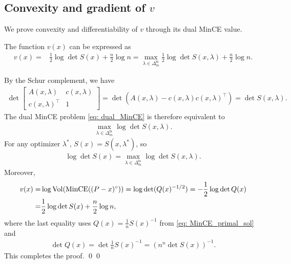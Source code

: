 \documentclass[smallextended]{svjour3}
\let\springerproof\proof
\let\endspringerproof\endproof
\renewenvironment{proof}{\springerproof}{%
  \ifhmode\qed\else\leavevmode\qed\fi\endspringerproof}
\newcommand{\V}{{\mathrm{Vol}}}
\begin{document}
\subsection[Convexity and gradient of v]{Convexity and gradient of $v$}
We prove convexity and differentiability of $v$ through its dual MinCE value.
\begin{lemma}\label{lemma: v_in_S}
The function $v(x)$ can be expressed as
\begin{align*}
    v(x)  =  & \frac{1}{2} \log \det S(x) + \frac{n}{2}\log n
    = \max_{\lambda \in \Delta_m^{\mathrm{fs}}}
    \frac{1}{2} \log \det S(x, \lambda)  +  \frac{n}{2}\log n.
\end{align*}
\end{lemma}
\begin{proof}
    By the Schur complement, we have
    \begin{align*}
         \det
    \begin{bmatrix}
        A(x, \lambda) & c(x, \lambda) \\
        c(x, \lambda)^\top & 1
    \end{bmatrix}
    = \det (A(x,\lambda) - c(x,\lambda)c(x, \lambda)^\top) = \det S(x, \lambda).
    \end{align*}
    The dual MinCE problem \eqref{eq: dual_MinCE} is therefore equivalent to
    \begin{align*}
        \max_{\lambda \in \Delta_m^{\mathrm{fs}}} \log \det S(x, \lambda).
    \end{align*}
    For any optimizer $\lambda^*$, $S(x)=S(x,\lambda^*)$, so
    \begin{align*}
        \log \det S(x) = \max_{\lambda \in \Delta_m^{\mathrm{fs}}} \log \det S(x, \lambda).
    \end{align*}
    Moreover,
    \begin{align}
        v(x) = & \log \V(\mathrm{MinCE}((P-x)^\circ)) =  \log \det ( Q(x)^{-1/2}) =  -\frac{1}{2}\log \det Q(x) \notag \\
        = & \frac{1}{2} \log \det S(x) + \frac{n}{2}\log n, \notag
    \end{align}
    where the last equality uses $Q(x)=\frac1nS(x)^{-1}$ from
    \eqref{eq: MinCE_primal_sol} and
    \begin{align*}
        \det Q(x) = \det \frac{1}{n}S(x)^{-1} = (n^n \det S(x))^{-1}.
    \end{align*}
    This completes the proof.
\end{proof}
\end{document}
